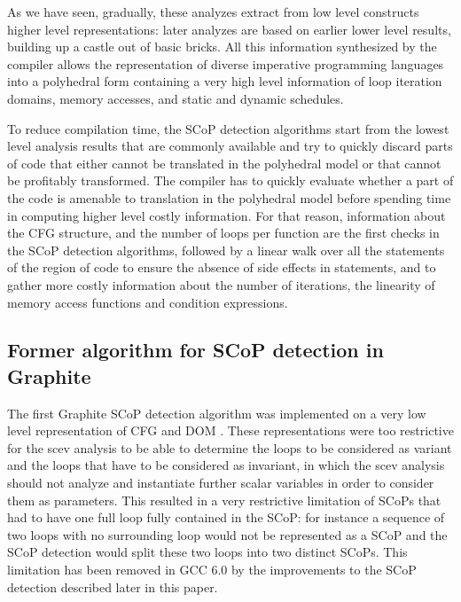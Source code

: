 \documentclass{sigplanconf}
\begin{document}
As we have seen, gradually, these analyzes extract from low level constructs
higher level representations: later analyzes are based on earlier lower level
results, building up a castle out of basic bricks.  All this information
synthesized by the compiler allows the representation of diverse imperative
programming languages into a polyhedral form \cite{Girbal} containing a very
high level information of loop iteration domains, memory accesses, and static
and dynamic schedules.

To reduce compilation time, the SCoP detection algorithms start from the lowest
level analysis results that are commonly available and try to quickly discard
parts of code that either cannot be translated in the polyhedral model or that
cannot be profitably transformed.  The compiler has to quickly evaluate whether
a part of the code is amenable to translation in the polyhedral model before
spending time in computing higher level costly information.  For that reason,
information about the CFG structure, and the number of loops per function are
the first checks in the SCoP detection algorithms, followed by a linear walk
over all the statements of the region of code to ensure the absence of side
effects in statements, and to gather more costly information about the number of
iterations, the linearity of memory access functions and condition expressions.

\subsection{Former algorithm for SCoP detection in Graphite}
\label{subsec:graphite-SCoP}
The first Graphite SCoP detection algorithm was implemented on a very low level
representation of CFG and DOM \cite{trifunovic}.  These representations were too
restrictive for the scev analysis to be able to determine the loops to be
considered as variant and the loops that have to be considered as invariant, in
which the scev analysis should not analyze and instantiate further scalar
variables in order to consider them as parameters.  This resulted in a very
restrictive limitation of SCoPs that had to have one full loop fully contained
in the SCoP: for instance a sequence of two loops with no surrounding loop would
not be represented as a SCoP and the SCoP detection would split these two loops
into two distinct SCoPs.  This limitation has been removed in GCC 6.0 by the
improvements to the SCoP detection described later in this paper.
\end{document}

